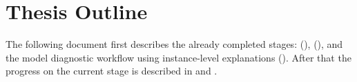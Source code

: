 \section{Thesis Outline}
The following document first describes the already completed stages: \infuse (), \prospector (), and the model diagnostic workflow using instance-level explanations ().
After that the progress on the current stage is described in  and .